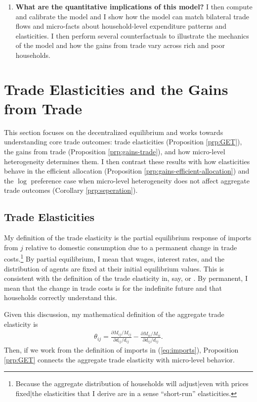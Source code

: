 \documentclass[12pt,pdftex]{article}
\begin{document}
\begin{onehalfspacing}
\begin{enumerate}
\item \textbf{What are the quantitative implications of this model?} I then compute and calibrate the model and I show how the model can match bilateral trade flows and micro-facts about household-level expenditure patterns and elasticities. I then perform several counterfactuals to illustrate the mechanics of the model and how the gains from trade vary across rich and poor households.
\end{enumerate}

\section{Trade Elasticities and the Gains from Trade}

This section focuses on the decentralized equilibrium and works towards understanding core trade outcomes: trade elasticities (Proposition \ref{prp:GET}), the gains from trade (Proposition \ref{prp:gains-trade}), and how micro-level heterogeneity determines them. I then contrast these results with how elasticities behave in the efficient allocation (Proposition \ref{prp:gains-efficient-allocation}) and the $\log$ preference case when micro-level heterogeneity does not affect aggregate trade outcomes (Corollary \ref{prp:seperation}).

\subsection{Trade Elasticities}\label{sec:trade-elasticity}

My definition of the trade elasticity is the partial equilibrium response of imports from $j$ relative to domestic consumption due to a permanent change in trade costs.\footnote{Because the aggregate distribution of households will adjust|even with prices fixed|the elasticities that I derive are in a sense ``short-run'' elasticities.} By partial equilibrium, I mean that wages, interest rates, and the distribution of agents are fixed at their initial equilibrium values. This is consistent with the definition of the trade elasticity in, say, \citet{arkolakis2012new} or \citet{simonovska2014elasticity}. By permanent, I mean that the change in trade costs is for the indefinite future and that households correctly understand this.

Given this discussion, my mathematical definition of the aggregate trade elasticity is
\begin{align}
\theta_{ij} = \frac{\partial M_{ij} / M_{ij}}{\partial d_{ij} / d_{ij}}  - \frac{\partial M_{ii} / M_{ii}}{\partial d_{ij} / d_{ij}}.
\label{eq:def_trade_elasticity}
\end{align}
Then, if we work from the definition of imports in (\ref{eq:imports}), Proposition \ref{prp:GET} connects the aggregate trade elasticity with micro-level behavior.


\end{onehalfspacing}
\end{document}
